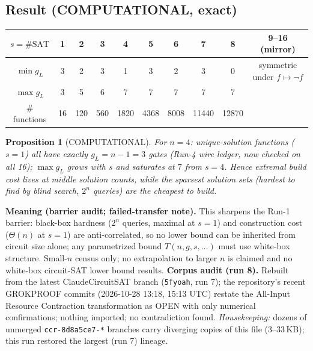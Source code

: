 \documentclass[11pt]{article}
\newtheorem{prop}{Proposition}
\begin{document}
\subsection{Result (COMPUTATIONAL, exact)}
\begin{center}\begin{tabular}{@{}c|ccccccccc@{}}\toprule
$s=\#\mathrm{SAT}$ & 1 & 2 & 3 & 4 & 5 & 6 & 7 & 8 & 9--16 (mirror)\\\midrule
$\min g_L$ & 3 & 2 & 3 & 1 & 3 & 2 & 3 & 0 & symmetric under $f\mapsto\neg f$\\
$\max g_L$ & 3 & 5 & 6 & 7 & 7 & 7 & 7 & 7 & \\
\# functions & 16 & 120 & 560 & 1820 & 4368 & 8008 & 11440 & 12870 & \\\bottomrule\end{tabular}\end{center}
\begin{prop}[COMPUTATIONAL] For $n=4$: unique-solution functions ($s=1$) all have exactly $g_L=n-1=3$ gates (Run-4 wire ledger, now checked on all 16); $\max g_L$ grows with $s$ and saturates at $7$ from $s=4$. Hence extremal build cost lives at \emph{middle} solution counts, while the sparsest solution sets (hardest to find by blind search, $2^n$ queries) are the cheapest to build.
\end{prop}
\textbf{Meaning (barrier audit; failed-transfer note).} This sharpens the Run-1 barrier: black-box hardness ($2^n$ queries, maximal at $s=1$) and construction cost ($\Theta(n)$ at $s=1$) are anti-correlated, so no lower bound can be inherited from circuit size alone; any parametrized bound $T(n,g,s,\dots)$ must use white-box structure. Small-$n$ census only; no extrapolation to larger $n$ is claimed and no white-box circuit-SAT lower bound results. \textbf{Corpus audit (run 8).} Rebuilt from the latest ClaudeCircuitSAT branch (\texttt{5fyoah}, run 7); the repository's recent GROKPROOF commits (2026-10-28 13:18, 15:13 UTC) restate the All-Input Resource Contraction transformation as OPEN with only numerical confirmations; nothing imported; no contradiction found. \emph{Housekeeping:} dozens of unmerged \texttt{ccr-8d8a5ce7-*} branches carry diverging copies of this file (3--33\,KB); this run restored the largest (run 7) lineage.
\end{document}

